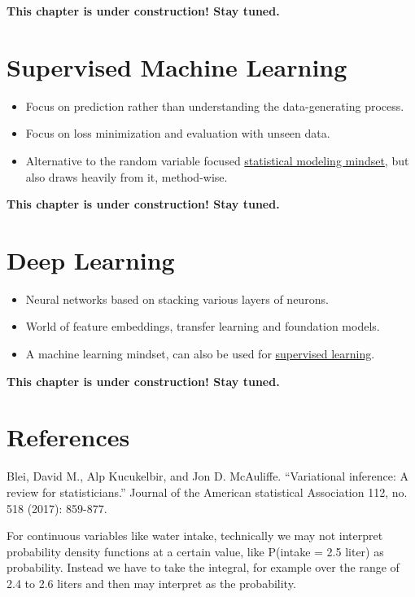 \documentclass[
  10pt,
]{scrbook}
\providecommand{\tightlist}{%
  \setlength{\itemsep}{0pt}\setlength{\parskip}{0pt}}
\begin{document}
\textbf{This chapter is under construction! Stay tuned.}

\hypertarget{supervised-ml}{%
\chapter{Supervised Machine Learning}\label{supervised-ml}}

\begin{itemize}
\tightlist
\item
  Focus on prediction rather than understanding the data-generating process.
\item
  Focus on loss minimization and evaluation with unseen data.
\item
  Alternative to the random variable focused \protect\hyperlink{statistical-modeling}{statistical modeling mindset}, but also draws heavily from it, method-wise.
\end{itemize}

\textbf{This chapter is under construction! Stay tuned.}

\hypertarget{deep-learning}{%
\chapter{Deep Learning}\label{deep-learning}}

\begin{itemize}
\tightlist
\item
  Neural networks based on stacking various layers of neurons.
\item
  World of feature embeddings, transfer learning and foundation models.
\item
  A machine learning mindset, can also be used for \protect\hyperlink{supervised-ml}{supervised learning}.
\end{itemize}

\textbf{This chapter is under construction! Stay tuned.}

\hypertarget{references}{%
\chapter*{References}\label{references}}


Blei, David M., Alp Kucukelbir, and Jon D. McAuliffe. ``Variational inference: A review for statisticians.'' Journal of the American statistical Association 112, no. 518 (2017): 859-877.

For continuous variables like water intake, technically we may not interpret probability density functions at a certain value, like P(intake = 2.5 liter) as probability. Instead we have to take the integral, for example over the range of 2.4 to 2.6 liters and then may interpret as the probability.
\end{document}
